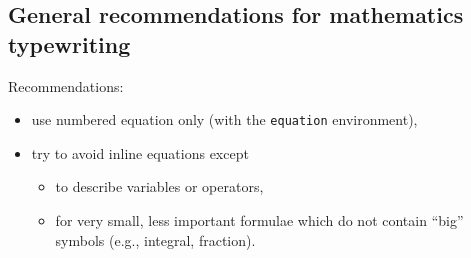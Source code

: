 	
	\subsection{General recommendations for mathematics typewriting}
		
		Recommendations:
		\begin{itemize}
			\item use numbered equation only (with the \texttt{equation} environment),
			\item try to avoid inline equations except
			\begin{itemize}
				\item to describe variables or operators,
				\item for very small, less important formulae which do not contain \enquote{big} symbols (e.g., integral, fraction).
			\end{itemize}
		\end{itemize}


